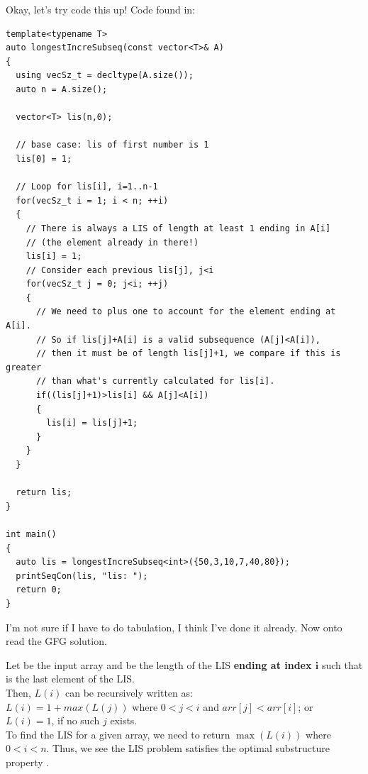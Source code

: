 Okay, let's try code this up!  Code found in:\\
\begin{lstlisting}[style=raycppnewsnippet]
template<typename T>
auto longestIncreSubseq(const vector<T>& A)
{
  using vecSz_t = decltype(A.size());
  auto n = A.size();

  vector<T> lis(n,0);
  
  // base case: lis of first number is 1
  lis[0] = 1;

  // Loop for lis[i], i=1..n-1
  for(vecSz_t i = 1; i < n; ++i)
  {
    // There is always a LIS of length at least 1 ending in A[i] 
    // (the element already in there!)
    lis[i] = 1;
    // Consider each previous lis[j], j<i
    for(vecSz_t j = 0; j<i; ++j)
    {
      // We need to plus one to account for the element ending at A[i].
      // So if lis[j]+A[i] is a valid subsequence (A[j]<A[i]),
      // then it must be of length lis[j]+1, we compare if this is greater
      // than what's currently calculated for lis[i].
      if((lis[j]+1)>lis[i] && A[j]<A[i])
      {
        lis[i] = lis[j]+1;
      }
    }
  }

  return lis;
}

int main()
{
  auto lis = longestIncreSubseq<int>({50,3,10,7,40,80});
  printSeqCon(lis, "lis: ");
  return 0;
}
\end{lstlisting}
I'm not sure if I have to do tabulation, I think I've done it already. Now
onto read the GFG solution.

\RayNotesEnd


Let  be the input array and  be the length of the
LIS \textbf{ending at index $\bm{i}$} such that  is the last
element of the LIS.\\

Then, $L(i)$ can be recursively written as:\\ 
$L(i) = 1 + max( L(j) )$ where $0 < j < i$ and $arr[j] < arr[i]$; or\\ 
$L(i) = 1$, if no such $j$ exists.\\

To find the LIS for a given array, we need to return $\max(L(i))$ where
$0<i<n$. Thus, we see the LIS problem satisfies the optimal substructure
property .

